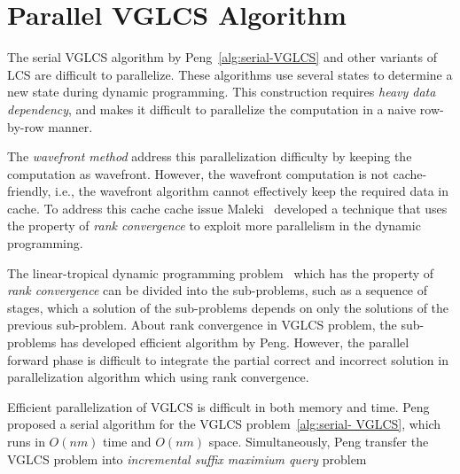 \section{Parallel VGLCS Algorithm} %
\label{sec:parallelVGLCS}

The serial VGLCS algorithm by Peng~\ref{alg:serial-VGLCS} and other
variants of LCS are difficult to parallelize.  These algorithms use
several states to determine a new state during dynamic programming.
This construction requires {\em heavy data dependency}, and makes it
difficult to parallelize the computation in a naive row-by-row manner.

The {\em wavefront method} address this parallelization difficulty by
keeping the computation as wavefront.  However, the wavefront
computation is not cache-friendly, i.e., the wavefront algorithm
cannot effectively keep the required data in cache.  To address this
cache cache issue Maleki~\cite{Maleki2016EfficientPU} developed a
technique that uses the property of {\em rank convergence} to exploit
more parallelism in the dynamic programming.


The linear-tropical dynamic programming
problem~\cite{Maleki2016EfficientPU} which has the property of {\em
  rank convergence} can be divided into the sub-problems, such as a
sequence of stages, which a solution of the sub-problems depends on
only the solutions of the previous sub-problem.  About rank
convergence in VGLCS problem, the sub-problems has developed efficient
algorithm by Peng.  However, the parallel forward phase is difficult
to integrate the partial correct and incorrect solution in
parallelization algorithm which using rank convergence.


\iffalse
在 $O(nm \alpha(n))$ 的序列算法 \ref{alg:serial-VGLCS} 中，
我們發現算法如大多數的變型 LCS 相同，依賴數個狀態以轉移當前狀態，
大量的資料依賴性不易於細粒度平行。使用波前運行平行是一種常見的解決方案，
由於這種平行對於運行時的快取不友善 (cache-unfriendly)，
在 Saeed Maleki ~\cite{saeed} 論文中提到如何使用 Rank Convergence 的特殊性質，
拓展出更高平行度來解決動態規劃的相關問題。
\fi




Efficient parallelization of VGLCS is difficult in both memory and time.
Peng proposed a serial algorithm for the VGLCS problem~\ref{alg:serial-
VGLCS}, which runs in $O(nm)$ time and $O(nm)$ space.  Simultaneously,
Peng transfer the VGLCS problem into {\em incremental suffix maximium
query} problem

